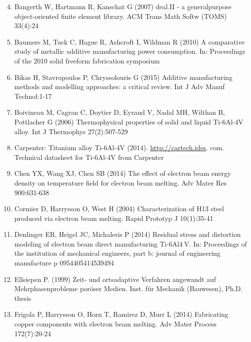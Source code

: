 \documentclass[10pt]{article}
\begin{document}
\begin{enumerate}
  \setcounter{enumi}{3}
  \item Bangerth W, Hartmann R, Kanschat G (2007) deal.II - a generalpurpose object-oriented finite element library. ACM Trans Math Softw (TOMS) 33(4):24

  \item Baumers M, Tuck C, Hague R, Ashcroft I, Wildman R (2010) A comparative study of metallic additive manufacturing power consumption. In: Proceedings of the 2010 solid freeform fabrication symposium

  \item Bikas H, Stavropoulos P, Chryssolouris G (2015) Additive manufacturing methods and modelling approaches: a critical review. Int J Adv Manuf Technol:1-17

  \item Boivineau M, Cagran C, Doytier D, Eyraud V, Nadal MH, Wilthan B, Pottlacher G (2006) Thermophysical properties of solid and liquid Ti-6Al-4V alloy. Int J Thermophys 27(2):507-529

  \item Carpenter: Titanium alloy Ti-6Al-4V (2014). \href{http://cartech.ides}{http://cartech.ides}. com. Technical datasheet for Ti-6Al-4V from Carpenter

  \item Chen YX, Wang XJ, Chen SB (2014) The effect of electron beam energy density on temperature field for electron beam melting. Adv Mater Res 900:631-638

  \item Cormier D, Harrysson O, West H (2004) Characterization of H13 steel produced via electron beam melting. Rapid Prototyp J 10(1):35-41

  \item Denlinger ER, Heigel JC, Michaleris P (2014) Residual stress and distortion modeling of electron beam direct manufacturing Ti-6Al$4 \mathrm{~V}$. In: Proceedings of the institution of mechanical engineers, part b: journal of engineering manufacture p 0954405414539494

  \item Ellsiepen P. (1999) Zeit- und ortsadaptive Verfahren angewandt auf Mehrphasenprobleme poröser Medien. Inst. für Mechanik (Bauwesen), Ph.D. thesis

  \item Frigola P, Harrysson O, Horn T, Ramirez D, Murr L (2014) Fabricating copper components with electron beam melting. Adv Mater Process 172(7):20-24


\end{enumerate}
\end{document}
